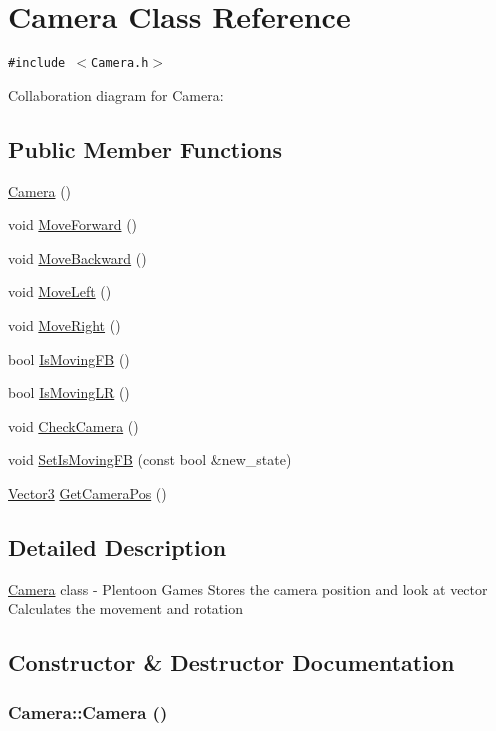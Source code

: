\hypertarget{class_camera}{
\section{Camera Class Reference}
\label{class_camera}
}
{\tt \#include $<$Camera.h$>$}

Collaboration diagram for Camera:\subsection*{Public Member Functions}
\begin{CompactItemize}
\item 
\hyperlink{class_camera_01f94c3543f56ede7af49dc778f19331}{Camera} ()
\item 
void \hyperlink{class_camera_00bd495b8f247ac7a9e5de1fd1866bef}{MoveForward} ()
\item 
void \hyperlink{class_camera_3ee9d79d50ebf1c365c2558ae4a5ea70}{MoveBackward} ()
\item 
void \hyperlink{class_camera_bbc8e3c66029cd2adbd59c64ab8e3b25}{MoveLeft} ()
\item 
void \hyperlink{class_camera_497ed87c48b0a09e25dc3adb9ee31ec7}{MoveRight} ()
\item 
bool \hyperlink{class_camera_190d48b772eeea0547285db6b4f6a6fe}{IsMovingFB} ()
\item 
bool \hyperlink{class_camera_fcc769dba8370d89bc0dbd490dcebc17}{IsMovingLR} ()
\item 
void \hyperlink{class_camera_5757577b0e11b8722bf251ee086eef1d}{CheckCamera} ()
\item 
void \hyperlink{class_camera_3783824757ec844c64f273de2ec7c276}{SetIsMovingFB} (const bool \&new\_\-state)
\item 
\hyperlink{class_vector3}{Vector3} \hyperlink{class_camera_7a2d4de877c54c012a81ecdf09872f61}{GetCameraPos} ()
\end{CompactItemize}


\subsection{Detailed Description}
\hyperlink{class_camera}{Camera} class - Plentoon Games Stores the camera position and look at vector Calculates the movement and rotation 

\subsection{Constructor \& Destructor Documentation}
\hypertarget{class_camera_01f94c3543f56ede7af49dc778f19331}{
\subsubsection[Camera]{\setlength{\rightskip}{0pt plus 5cm}Camera::Camera ()}}
\label{class_camera_01f94c3543f56ede7af49dc778f19331}


